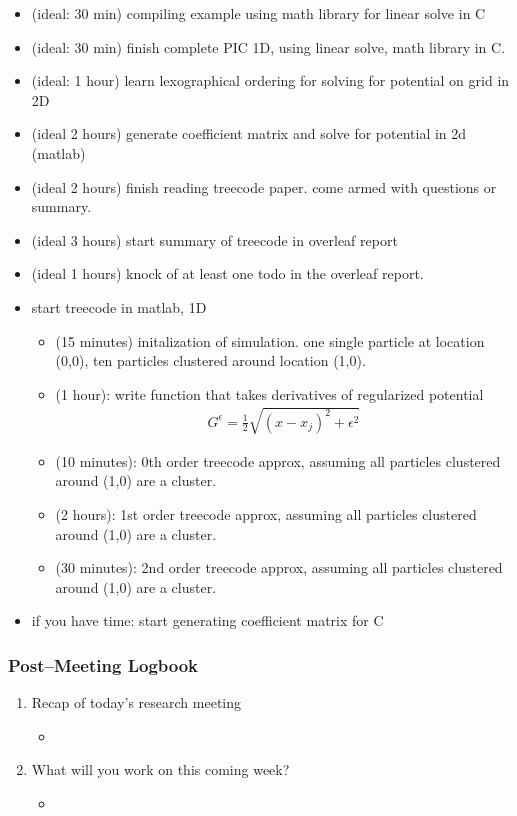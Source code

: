 \documentclass[12pt]{article}
\begin{document}
\begin{enumerate}
  \begin{itemize}
  \item (ideal: 30 min) compiling example using math library for
    linear solve in C
  \item (ideal: 30 min) finish complete PIC 1D, using linear solve,
    math library in C.
  \item (ideal: 1 hour) learn lexographical ordering for solving for
    potential on grid in 2D
  \item (ideal 2 hours) generate coefficient matrix and solve for
    potential in 2d (matlab)
  \item (ideal 2 hours) finish reading treecode paper.  come armed
    with questions or summary.
  \item (ideal 3 hours) start summary of treecode in overleaf report
  \item (ideal 1 hours) knock of at least one todo in the overleaf
    report.
  \item start treecode in matlab, 1D
    \begin{itemize}
    \item (15 minutes) initalization of simulation.  one single
      particle at location (0,0), ten particles clustered around
      location (1,0).
    \item (1 hour): write function that takes derivatives of
      regularized potential
      \begin{align*}
        G^\epsilon = \frac{1}2{}\sqrt{(x-x_j)^2 + \epsilon^2}
      \end{align*}
    \item (10 minutes): 0th order treecode approx, assuming all
      particles clustered around (1,0) are a cluster.
    \item (2 hours): 1st order treecode approx, assuming all
      particles clustered around (1,0) are a cluster.
    \item (30 minutes): 2nd order treecode approx, assuming all
      particles clustered around (1,0) are a cluster.
    \end{itemize}
  \item if you have time: start generating coefficient matrix for C
  \end{itemize}


\end{enumerate}

\subsubsection*{Post--Meeting Logbook}
\begin{enumerate}
\item Recap of today's research meeting

  \begin{itemize}
  \item
  \end{itemize}

\item What will you work on this coming week?

  \begin{itemize}
  \item
  \end{itemize}


\end{enumerate}
\end{document}
